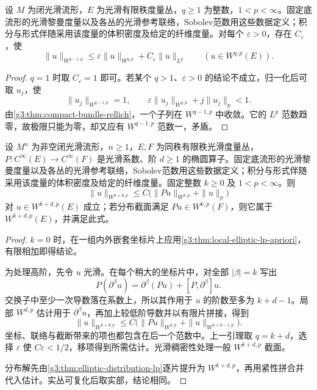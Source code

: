 \begin{lemma}\label{g3:lem:compact-sobolev-interpolation}
	设 \(M\) 为闭光滑流形，\(E\) 为光滑有限秩度量丛，\(q\ge1\) 为整数，\(1<p<\infty\)。固定底流形的光滑黎曼度量以及各丛的光滑参考联络，Sobolev范数用这些数据定义；积分与形式伴随采用该度量的体积密度及给定的纤维度量。对每个 \(\varepsilon>0\)，存在 \(C_\varepsilon\)，使
	\[
		\|u\|_{W^{q-1,p}}\le\varepsilon\|u\|_{W^{q,p}}+C_\varepsilon\|u\|_{L^p}
		\qquad(u\in W^{q,p}(E)).
	\]
\end{lemma}
\begin{proof}
	\(q=1\) 时取 \(C_\varepsilon=1\) 即可。若某个 \(q>1\)、\(\varepsilon>0\) 的结论不成立，归一化后可取 \(u_j\)，使
	\[
		\|u_j\|_{W^{q-1,p}}=1,\qquad
		\varepsilon\|u_j\|_{W^{q,p}}+j\|u_j\|_p<1.
	\]
	由\cref{g3:thm:compact-bundle-rellich}，一个子列在 \(W^{q-1,p}\) 中收敛。它的 \(L^p\) 范数趋零，故极限只能为零，却又应有 \(W^{q-1,p}\) 范数一，矛盾。
\end{proof}

\begin{theorem}\label{g3:thm:global-elliptic-wkp}
	设 \(M^n\) 为非空闭光滑流形，\(n\ge1\)，\(E,F\) 为同秩有限秩光滑度量丛，\(P:C^\infty(E)\to C^\infty(F)\) 是光滑系数、阶 \(d\ge1\) 的椭圆算子。固定底流形的光滑黎曼度量以及各丛的光滑参考联络，Sobolev范数用这些数据定义；积分与形式伴随采用该度量的体积密度及给定的纤维度量。固定整数 \(k\ge0\) 及 \(1<p<\infty\)。则
	\begin{equation}\label{g3:eq:global-elliptic-wkp}
		\|u\|_{W^{k+d,p}}\le C\bigl(\|Pu\|_{W^{k,p}}+\|u\|_p\bigr)
	\end{equation}
	对 \(u\in W^{k+d,p}(E)\) 成立；若分布截面满足 \(Pu\in W^{k,p}(F)\)，则它属于 \(W^{k+d,p}(E)\)，并满足此式。
\end{theorem}
\begin{proof}
	\(k=0\) 时，在一组内外嵌套坐标片上应用\cref{g3:thm:local-elliptic-lp-apriori}，有限相加即得结论。

	为处理高阶，先令 \(u\) 光滑。在每个稍大的坐标片中，对全部 \(|\beta|=k\) 写出
	\[
		P(\partial^\beta u)=\partial^\beta(Pu)+[P,\partial^\beta]u.
	\]
	交换子中至少一次导数落在系数上，所以其作用于 \(u\) 的阶数至多为 \(k+d-1\)。局部 \(W^{d,p}\) 估计用于 \(\partial^\beta u\)，再加上较低阶导数并以有限片拼接，得到
	\[
		\|u\|_{W^{k+d,p}}
		\le C\bigl(\|Pu\|_{W^{k,p}}+\|u\|_{W^{k+d-1,p}}\bigr).
	\]
	坐标、联络与截断带来的项也都包含在后一个范数中。上一引理取 \(q=k+d\)，选择 \(\varepsilon\) 使 \(C\varepsilon<1/2\)，移项得到所需估计。光滑稠密性处理一般 \(W^{k+d,p}\) 截面。

	分布解先由\cref{g3:thm:elliptic-distribution-lp}逐片提升为 \(W^{k+d,p}\)，再用紧性拼合并代入估计。实丛可复化后取实部，结论相同。
\end{proof}

